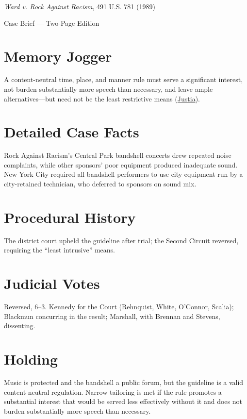 \documentclass[12pt]{article}
\begin{document}
\begin{center}
{\LARGE \textit{Ward v. Rock Against Racism}, 491 U.S. 781 (1989)\par}
\vspace{0.5em}
{\large Case Brief --- Two-Page Edition\par}
\end{center}

\section{Memory Jogger}
A content-neutral time, place, and manner rule must serve a significant interest, not burden substantially more speech than necessary, and leave ample alternatives---but need not be the least restrictive means (\href{https://supreme.justia.com/cases/federal/us/491/781/}{Justia}).

\section{Detailed Case Facts}
Rock Against Racism's Central Park bandshell concerts drew repeated noise complaints, while other sponsors' poor equipment produced inadequate sound. New York City required all bandshell performers to use city equipment run by a city-retained technician, who deferred to sponsors on sound mix.

\section{Procedural History}
The district court upheld the guideline after trial; the Second Circuit reversed, requiring the ``least intrusive'' means.

\section{Judicial Votes}
Reversed, 6--3. Kennedy for the Court (Rehnquist, White, O'Connor, Scalia); Blackmun concurring in the result; Marshall, with Brennan and Stevens, dissenting.

\section{Holding}
Music is protected and the bandshell a public forum, but the guideline is a valid content-neutral regulation. Narrow tailoring is met if the rule promotes a substantial interest that would be served less effectively without it and does not burden substantially more speech than necessary.
\end{document}
